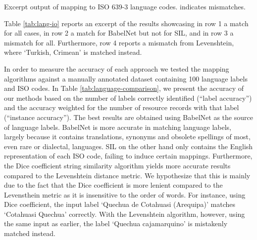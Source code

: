 \documentclass[11pt]{article}
\begin{document}
\begin{table}
{\begin{minipage}{\textwidth}
\end{minipage} }
    \caption{\label{tab:lang-io}Excerpt output of mapping to ISO 639-3 language
    codes. \newline * indicates mismatches.}
\end{table}



Table \ref{tab:lang-io} reports an excerpt of the results showcasing in row 1 a
match for all cases, in row 2 a match for BabelNet but not for SIL, and in row 3
a mismatch for all. Furthermore, row 4 reports a mismatch from Levenshtein,
where `Turkish, Crimean' is matched instead.


In order to measure the accuracy of each approach we tested the mapping
algorithms against a manually annotated dataset containing 100 language labels
and ISO codes.
In Table \ref{tab:language-comparison}, we present the accuracy of our methods
based on the number of labels correctly identified (``label accuracy'') and
the accuracy weighted for the number of
resource records with that label (``instance accuracy'').
The best results are
obtained using BabelNet as the source of language labels. BabelNet is more
accurate in matching language labels, largely because it contains translations,
synonyms and obsolete spellings of most, even rare or dialectal, languages. SIL
on the other hand only contains the English representation of each ISO code,
failing to induce certain mappings. Furthermore, the Dice coefficient string
similarity algorithm yields more accurate results compared to the Levenshtein
distance metric. We hypothesize that this is mainly due to the fact that the
Dice coefficient is more lenient compared to the Levensthein metric as it is
insensitive to the order of words. For instance, using Dice coefficient, the
input label `Quechua de Cotahuasi (Arequipa)' matches `Cotahuasi Quechua'
correctly. With the Levenshtein algorithm, however, using the same input as
earlier, the label `Quechua cajamarquino' is mistakenly matched instead.
\end{document}
